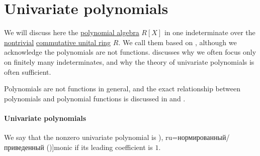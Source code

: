 \section{Univariate polynomials}\label{sec:univariate_polynomials}

We will discuss here the \hyperref[def:polynomial_algebra]{polynomial algebra} \( R[X] \) in one indeterminate over the \hyperref[def:ring/trivial]{nontrivial} \hyperref[def:ring/commutative]{commutative unital ring} \( R \). We call them  based on , although we acknowledge the polynomials are not functions.  discusses why we often focus only on finitely many indeterminates, and why the theory of univariate polynomials is often sufficient.

Polynomials are not functions in general, and the exact relationship between polynomials and polynomial functions is discussed in  and .

\paragraph{Univariate polynomials}

\begin{definition}\label{def:monic_polynomial}
  We say that the nonzero univariate polynomial is \term[bg=нормиран (\cite[409]{Обрешков1962ВисшаАлгебра}), ru=нормированный/приведенный (\cite[102]{Винберг2014КурсАлгебры})]{monic} if its leading coefficient is \( 1 \).
\end{definition}

